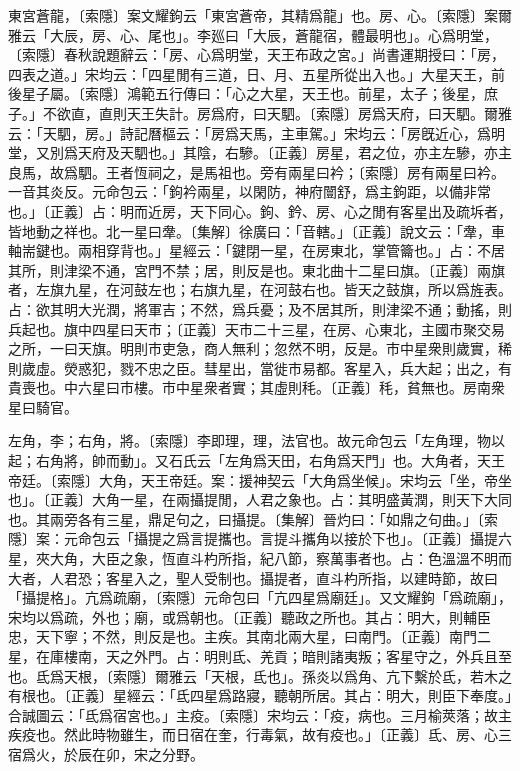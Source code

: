 東宮蒼龍，〔索隱〕案文耀鉤云「東宮蒼帝，其精爲龍」也。房、心。〔索隱〕案爾雅云「大辰，房、心、尾也」。李廵曰「大辰，蒼龍宿，體最明也」。心爲明堂，〔索隱〕春秋說題辭云：「房、心爲明堂，天王布政之宮。」尚書運期授曰：「房，四表之道。」宋均云：「四星閒有三道，日、月、五星所從出入也。」大星天王，前後星子屬。〔索隱〕鴻範五行傳曰：「心之大星，天王也。前星，太子；後星，庶子。」不欲直，直則天王失計。房爲府，曰天駟。〔索隱〕房爲天府，曰天駟。爾雅云：「天駟，房。」詩記曆樞云：「房爲天馬，主車駕。」宋均云：「房旣近心，爲明堂，又別爲天府及天駟也。」其陰，右驂。〔正義〕房星，君之位，亦主左驂，亦主良馬，故爲駟。王者恆祠之，是馬祖也。旁有兩星曰衿；〔索隱〕房有兩星曰衿。一音其炎反。元命包云：「鉤衿兩星，以閑防，神府闓舒，爲主鉤距，以備非常也。」〔正義〕占：明而近房，天下同心。鉤、鈐、房、心之閒有客星出及疏坼者，皆地動之祥也。北一星曰舝。〔集解〕徐廣曰：「音轄。」〔正義〕說文云：「舝，車軸耑鍵也。兩相穿背也。」星經云：「鍵閉一星，在房東北，掌管籥也。」占：不居其所，則津梁不通，宮門不禁；居，則反是也。東北曲十二星曰旗。〔正義〕兩旗者，左旗九星，在河鼓左也；右旗九星，在河鼓右也。皆天之鼓旗，所以爲旌表。占：欲其明大光潤，將軍吉；不然，爲兵憂；及不居其所，則津梁不通；動搖，則兵起也。旗中四星曰天市；〔正義〕天市二十三星，在房、心東北，主國市聚交易之所，一曰天旗。明則市吏急，商人無利；忽然不明，反是。市中星衆則歲實，稀則歲虛。熒惑犯，戮不忠之臣。彗星出，當徙市易都。客星入，兵大起；出之，有貴喪也。中六星曰市樓。市中星衆者實；其虛則秏。〔正義〕秏，貧無也。房南衆星曰騎官。

左角，李；右角，將。〔索隱〕李即理，理，法官也。故元命包云「左角理，物以起；右角將，帥而動」。又石氏云「左角爲天田，右角爲天門」也。大角者，天王帝廷。〔索隱〕大角，天王帝廷。案：援神契云「大角爲坐候」。宋均云「坐，帝坐也」。〔正義〕大角一星，在兩攝提閒，人君之象也。占：其明盛黃潤，則天下大同也。其兩旁各有三星，鼎足句之，曰攝提。〔集解〕晉灼曰：「如鼎之句曲。」〔索隱〕案：元命包云「攝提之爲言提攜也。言提斗攜角以接於下也」。〔正義〕攝提六星，夾大角，大臣之象，恆直斗杓所指，紀八節，察萬事者也。占：色溫溫不明而大者，人君恐；客星入之，聖人受制也。攝提者，直斗杓所指，以建時節，故曰「攝提格」。亢爲疏廟，〔索隱〕元命包曰「亢四星爲廟廷」。又文耀鉤「爲疏廟」，宋均以爲疏，外也；廟，或爲朝也。〔正義〕聽政之所也。其占：明大，則輔臣忠，天下寧；不然，則反是也。主疾。其南北兩大星，曰南門。〔正義〕南門二星，在庫樓南，天之外門。占：明則氐、羌貢；暗則諸夷叛；客星守之，外兵且至也。氐爲天根，〔索隱〕爾雅云「天根，氐也」。孫炎以爲角、亢下繫於氐，若木之有根也。〔正義〕星經云：「氐四星爲路寢，聽朝所居。其占：明大，則臣下奉度。」合誠圖云：「氐爲宿宮也。」主疫。〔索隱〕宋均云：「疫，病也。三月榆莢落；故主疾疫也。然此時物雖生，而日宿在奎，行毒氣，故有疫也。」〔正義〕氐、房、心三宿爲火，於辰在卯，宋之分野。


